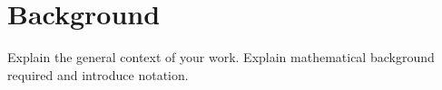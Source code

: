 \chapter{Background}\label{chap:background}
Explain the general context of your work.
Explain mathematical background required and introduce notation.

